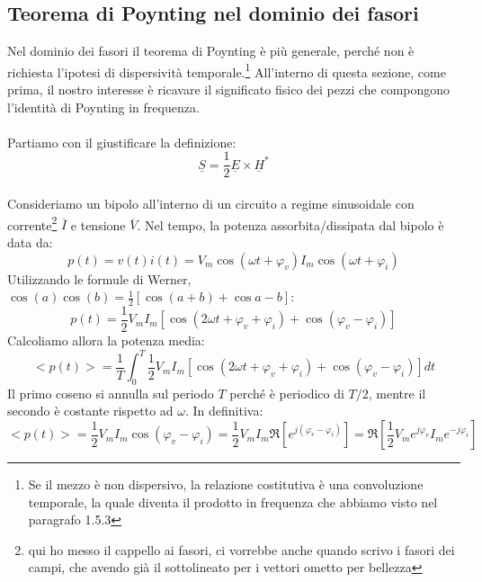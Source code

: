 \documentclass{book}
\begin{document}
    \subsection{Teorema di Poynting nel dominio dei fasori}
        Nel dominio dei fasori il teorema di Poynting è più generale, perché non è richiesta l'ipotesi di dispersività
        temporale.\footnote{Se il mezzo è non dispersivo, la relazione costitutiva è una convoluzione temporale, la quale diventa il prodotto
        in frequenza che abbiamo visto nel paragrafo 1.5.3} All'interno di questa sezione, come prima, il nostro interesse
        è ricavare il significato fisico dei pezzi che compongono l'identità di Poynting in frequenza. 
        \\ \\ Partiamo con il giustificare la definizione:
        \begin{equation}
            \underline{S} = \frac{1}{2}\underline{E} \times \underline{H}^{*}
        \end{equation} \\
        Consideriamo un bipolo all'interno di un circuito a regime sinusoidale con corrente\footnote{qui ho messo il cappello ai fasori, ci vorrebbe anche
        quando scrivo i fasori dei campi, che avendo già il sottolineato per i vettori ometto per bellezza} $\overline{I}$
        e tensione $\overline{V}$. Nel tempo, la potenza assorbita/dissipata dal bipolo è data da:
        \begin{equation}
            p(t) = v(t)i(t)=V_{m}\cos{(\omega t + \varphi_{v})}I_{m}\cos{(\omega t + \varphi_{i})}
        \end{equation}
        Utilizzando le formule di Werner, $\cos{(a)}\cos{(b)} = \frac{1}{2}[\cos{(a+b)}+\cos{a-b}]$:
        \begin{equation}
            p(t) = \frac{1}{2}V_{m}I_{m}[\cos{(2\omega t + \varphi_{v}+\varphi_{i})}+\cos{( \varphi_{v}-\varphi_{i})}]
        \end{equation}
        Calcoliamo allora la potenza media:
        \begin{equation}
            <p(t)> = \frac{1}{T} \int_{0} ^{T} \frac{1}{2}V_{m}I_{m}[\cos{(2\omega t + \varphi_{v}+\varphi_{i})}+\cos{( \varphi_{v}-\varphi_{i})}] dt
        \end{equation}
        Il primo coseno si annulla sul periodo $T$ perché è periodico di $T/2$, mentre il secondo è costante rispetto ad $\omega$. In definitiva:
        \begin{equation}
            <p(t)>=\frac{1}{2}V_{m}I_{m}\cos{(\varphi_{v}-\varphi_{i})} = \frac{1}{2}V_{m}I_{m}\Re[e^{j(\varphi_{v}-\varphi_{i})}] = \Re[\frac{1}{2}V_{m}e^{j\varphi_{v}}I_{m}e^{-j\varphi_{i}}]
        \end{equation}
\end{document}
